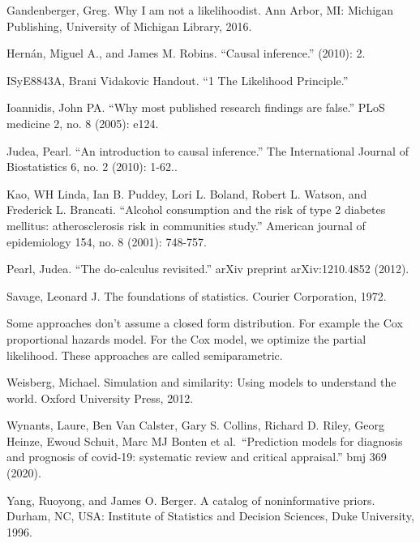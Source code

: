 \documentclass[
  10pt,
]{scrbook}
\begin{document}
Gandenberger, Greg. Why I am not a likelihoodist. Ann Arbor, MI: Michigan Publishing, University of Michigan Library, 2016.

Hernán, Miguel A., and James M. Robins. ``Causal inference.'' (2010): 2.

ISyE8843A, Brani Vidakovic Handout. ``1 The Likelihood Principle.''

Ioannidis, John PA. ``Why most published research findings are false.'' PLoS medicine 2, no. 8 (2005): e124.

Judea, Pearl. ``An introduction to causal inference.'' The International Journal of Biostatistics 6, no. 2 (2010): 1-62..

Kao, WH Linda, Ian B. Puddey, Lori L. Boland, Robert L. Watson, and Frederick L. Brancati. ``Alcohol consumption and the risk of type 2 diabetes mellitus: atherosclerosis risk in communities study.'' American journal of epidemiology 154, no. 8 (2001): 748-757.

Pearl, Judea. ``The do-calculus revisited.'' arXiv preprint arXiv:1210.4852 (2012).

Savage, Leonard J. The foundations of statistics. Courier Corporation, 1972.

Some approaches don't assume a closed form distribution. For example the Cox proportional hazards model. For the Cox model, we optimize the partial likelihood. These approaches are called semiparametric.

Weisberg, Michael. Simulation and similarity: Using models to understand the world. Oxford University Press, 2012.

Wynants, Laure, Ben Van Calster, Gary S. Collins, Richard D. Riley, Georg Heinze, Ewoud Schuit, Marc MJ Bonten et al.~``Prediction models for diagnosis and prognosis of covid-19: systematic review and critical appraisal.'' bmj 369 (2020).

Yang, Ruoyong, and James O. Berger. A catalog of noninformative priors. Durham, NC, USA: Institute of Statistics and Decision Sciences, Duke University, 1996.

\printindex
\thispagestyle{empty}
\end{document}
